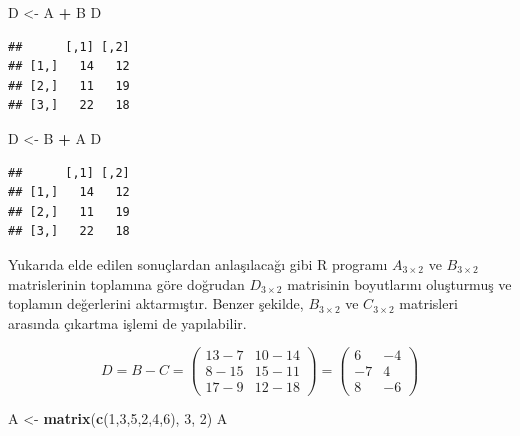 \documentclass[
]{book}
\newenvironment{Shaded}{\begin{snugshade}}{\end{snugshade}}
\newcommand{\DecValTok}[1]{\textcolor[rgb]{0.00,0.00,0.81}{#1}}
\newcommand{\FunctionTok}[1]{\textcolor[rgb]{0.13,0.29,0.53}{\textbf{#1}}}
\newcommand{\NormalTok}[1]{#1}
\newcommand{\OtherTok}[1]{\textcolor[rgb]{0.56,0.35,0.01}{#1}}
\newcommand{\SpecialCharTok}[1]{\textcolor[rgb]{0.81,0.36,0.00}{\textbf{#1}}}
\begin{document}
\begin{Shaded}
\begin{Highlighting}[]
\NormalTok{ D }\OtherTok{\textless{}{-}}\NormalTok{ A }\SpecialCharTok{+}\NormalTok{ B }
\NormalTok{ D }
\end{Highlighting}
\end{Shaded}

\begin{verbatim}
##      [,1] [,2]
## [1,]   14   12
## [2,]   11   19
## [3,]   22   18
\end{verbatim}

\begin{Shaded}
\begin{Highlighting}[]
\NormalTok{ D }\OtherTok{\textless{}{-}}\NormalTok{ B }\SpecialCharTok{+}\NormalTok{ A }
\NormalTok{ D }
\end{Highlighting}
\end{Shaded}

\begin{verbatim}
##      [,1] [,2]
## [1,]   14   12
## [2,]   11   19
## [3,]   22   18
\end{verbatim}

Yukarıda elde edilen sonuçlardan anlaşılacağı gibi R programı \(A_{3×2}\) ve \(B_{3×2}\) matrislerinin toplamına göre doğrudan \(D_{3×2}\) matrisinin boyutlarını oluşturmuş ve toplamın değerlerini aktarmıştır. Benzer şekilde, \(B_{3×2}\) ve \(C_{3×2}\) matrisleri arasında çıkartma işlemi de yapılabilir.

\[D=B-C=\begin{pmatrix}
 13-7 & 10-14 \\
 8-15 & 15-11 \\
 17-9 & 12-18
\end{pmatrix}
=
\begin{pmatrix}
 6 & -4 \\
 -7 & 4 \\
 8 & -6
\end{pmatrix} \]

\begin{Shaded}
\begin{Highlighting}[]
\NormalTok{ A }\OtherTok{\textless{}{-}} \FunctionTok{matrix}\NormalTok{(}\FunctionTok{c}\NormalTok{(}\DecValTok{1}\NormalTok{,}\DecValTok{3}\NormalTok{,}\DecValTok{5}\NormalTok{,}\DecValTok{2}\NormalTok{,}\DecValTok{4}\NormalTok{,}\DecValTok{6}\NormalTok{), }\DecValTok{3}\NormalTok{, }\DecValTok{2}\NormalTok{) }
\NormalTok{ A }
\end{Highlighting}
\end{Shaded}
\end{document}
